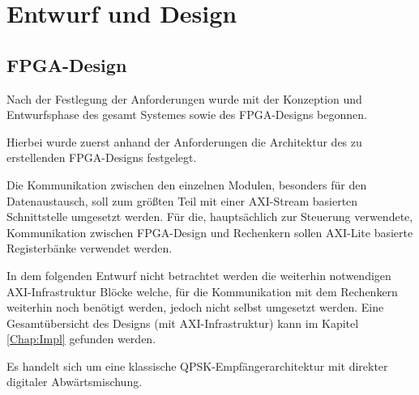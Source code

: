 \chapter{Entwurf und Design}
\section{\acs{FPGA}-Design}
Nach der Festlegung der Anforderungen wurde mit der Konzeption und Entwurfsphase des gesamt Systemes sowie des \acs{FPGA}-Designs begonnen.

Hierbei wurde zuerst anhand der Anforderungen die Architektur des zu erstellenden FPGA-Designs festgelegt.

Die Kommunikation zwischen den einzelnen Modulen, besonders für den Datenaustausch, soll zum größten Teil mit einer \acs{AXI}-Stream basierten 
Schnittstelle umgesetzt werden. Für die, hauptsächlich zur Steuerung verwendete, Kommunikation zwischen \acs{FPGA}-Design und Rechenkern sollen
\acs{AXI}-Lite basierte Registerbänke verwendet werden.

In dem folgenden Entwurf nicht betrachtet werden die weiterhin notwendigen \acs{AXI}-Infrastruktur Blöcke welche, für die Kommunikation mit dem Rechenkern weiterhin noch benötigt werden,
jedoch nicht selbst umgesetzt werden. Eine Gesamtübersicht des Designs (mit \acs{AXI}-Infrastruktur) kann im Kapitel \ref{Chap:Impl} gefunden werden.

Es handelt sich um eine klassische \acs{QPSK}-Empfängerarchitektur mit direkter digitaler Abwärtsmischung.

